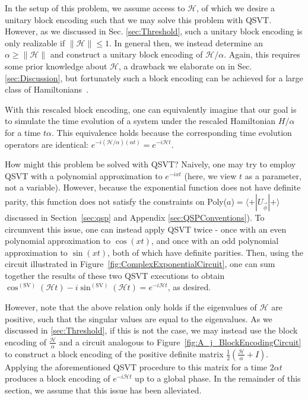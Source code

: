 \documentclass[aps,pra,showpacs,notitlepage,twocolumn,superscriptaddress,nofootinbib]{revtex4-1}
\begin{document}
    In the setup of this problem, we assume access to $\mathcal{H}$, of which we desire a unitary block encoding such that we may solve this problem with QSVT. However, as we discussed in Sec. \ref{sec:Threshold}, such a unitary block encoding is only realizable if $\|\mathcal{H}\| \leq 1$. In general then, we instead determine an $\alpha \geq \| \mathcal{H}\|$ and construct a unitary block encoding of $\mathcal{H}/\alpha$. Again, this requires some prior knowledge about $\mathcal{H}$, a drawback we elaborate on in Sec. \ref{sec:Discussion}, but fortunately such a block encoding can be achieved for a large class of Hamiltonians~\cite{Low_2019, Gily_n_2019}. 
    
    With this rescaled block encoding, one can equivalently imagine that our goal is to simulate the time evolution of a system under the rescaled Hamiltonian $H/\alpha$ for a time $t \alpha$. This equivalence holds because the corresponding time evolution operators are identical: $e^{-i(\mathcal{H}/\alpha) (\alpha t)} = e^{-i\mathcal{H}t}$.
    
    How might this problem be solved with QSVT? Naively, one may try to employ QSVT with a polynomial approximation to $e^{-ixt}$ (here, we view $t$ as a parameter, not a variable). However, because the exponential function does not have definite parity, this function does not satisfy the constraints on Poly($a$)$= \langle + | U_{\vec{\phi}} | +\rangle$ discussed in Section~\ref{sec:qsp} and Appendix \ref{sec:QSPConventions}). To circumvent this issue, one can instead apply QSVT twice - once with an even polynomial approximation to $\cos(xt)$, and once with an odd polynomial approximation to $\sin(xt)$, both of which have definite parities. Then, using the circuit illustrated in Figure~\ref{fig:ComplexExponentialCircuit}, one can sum together the results of these two QSVT executions to obtain $\cos^{(\text{SV})}(\mathcal{H}t) - i\sin^{(\text{SV})}(\mathcal{H}t) = e^{-i\mathcal{H}t}$, as desired. 
    
    However, note that the above relation only holds if the eigenvalues of $\mathcal{H}$ are positive, such that the singular values are equal to the eigenvalues. As we discussed in \ref{sec:Threshold}, if this is not the case, we may instead use the block encoding of $\frac{\mathcal{H}}{\alpha}$ and a circuit analogous to Figure~\ref{fig:A_j_BlockEncodingCircuit} to construct a block encoding of the positive definite matrix $\frac{1}{2}\left(\frac{\mathcal{H}}{\alpha}+I\right)$. Applying the aforementioned QSVT procedure to this matrix for a time $2\alpha t$ produces a block encoding of $e^{-i\mathcal{H}t}$ up to a global phase. In the remainder of this section, we assume that this issue has been alleviated. 
    
\end{document}
